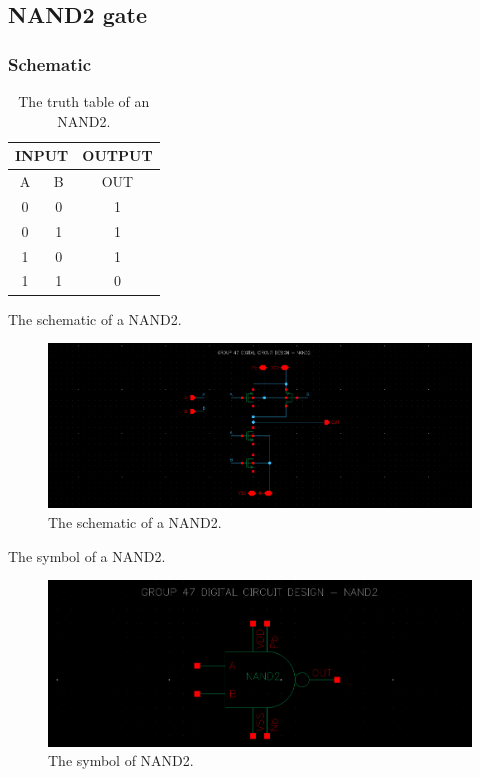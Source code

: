 \subsection{NAND2 gate}

\subsubsection{Schematic}

\begin{table}[H]
	\centering
	\begin{tabular}{|c|c|c|}
		\hline
		\multicolumn{2}{|c|}{INPUT} & OUTPUT \\
		\hline
		A & B  & OUT\\
		\hline
		0 & 0 & 1 \\
		\hline
		0 & 1 & 1\\
		\hline
		1 & 0 & 1\\
		\hline
		1 & 1 & 0\\
		\hline
	\end{tabular}
	\caption{The truth table of an NAND2.}
	\label{t_the truth table of NAND2}
\end{table}

The schematic of a NAND2.

\begin{figure}[H]
	\centering
	\includegraphics[width=.6\linewidth]{section/EX1/NAND/EX1_NAND2_schematic.png}
	\caption{The schematic of a NAND2.}
	\label{f_EX1_NAND2_schematic}
\end{figure} 

The symbol of a NAND2.

\begin{figure}[H]
	\centering
	\includegraphics[width=.6\linewidth]{section/EX1/NAND/EX1_NAND2_symbol.png}
	\caption{The symbol of NAND2.}
	\label{f_EX1_NAND2_symbol}
\end{figure}

